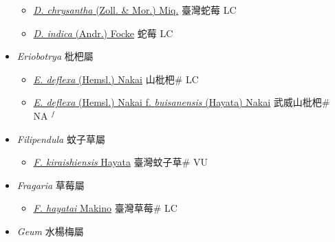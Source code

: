 \begin{itemize}
  \begin{itemize}
        \item[] \href{http://www.theplantlist.org/tpl1.1/search?q=Duchesnea+chrysantha}{\textit{D. chrysantha} (Zoll. \& Mor.) Miq.}   臺灣蛇莓 LC
        \item[] \href{http://www.theplantlist.org/tpl1.1/search?q=Duchesnea+indica}{\textit{D. indica} (Andr.) Focke}   蛇莓 LC
  \end{itemize}
 \item[] \textit{Eriobotrya} 枇杷屬
                    
  \begin{itemize}
        \item[] \href{http://www.theplantlist.org/tpl1.1/search?q=Eriobotrya+deflexa}{\textit{E. deflexa} (Hemsl.) Nakai}   山枇杷\# LC
        \item[] \href{http://www.theplantlist.org/tpl1.1/search?q=Eriobotrya+deflexa+ f. +buisanensis}{\textit{E. deflexa} (Hemsl.) Nakai  f.  \textit{buisanensis} (Hayata) Nakai}   武威山枇杷\# NA $^f$
  \end{itemize}
 \item[] \textit{Filipendula} 蚊子草屬
                    
  \begin{itemize}
        \item[] \href{http://www.theplantlist.org/tpl1.1/search?q=Filipendula+kiraishiensis}{\textit{F. kiraishiensis} Hayata}   臺灣蚊子草\# VU
  \end{itemize}
 \item[] \textit{Fragaria} 草莓屬
                    
  \begin{itemize}
        \item[] \href{http://www.theplantlist.org/tpl1.1/search?q=Fragaria+hayatai}{\textit{F. hayatai} Makino}   臺灣草莓\# LC
  \end{itemize}
 \item[] \textit{Geum} 水楊梅屬
                    

\end{itemize}
